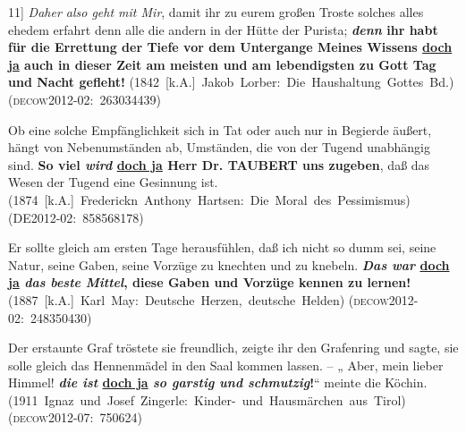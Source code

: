 \begin{exe}
	\ex\label{518} 

	11] \emph{Daher also geht mit Mir}, damit ihr zu eurem großen Troste solches alles ehedem erfahrt denn alle die andern in der Hütte der 			Purista; \textbf{\textit{denn} ihr habt für die Errettung der Tiefe vor dem Untergange Meines Wissens \underline{doch ja} auch in dieser Zeit am 			meisten und am lebendigsten zu Gott Tag und Nacht gefleht!}	
	\newline\hbox{}\hfill\hbox{(1842 [k.A.] Jakob Lorber: Die Haushaltung Gottes Bd.)}
	\newline
	\hbox{}\hfill\hbox{\scshape(decow2012-02: 263034439)}
\end{exe}								                        
											  
\begin{exe}
	\ex\label{519} 

	Ob eine solche Empfänglichkeit sich in Tat oder auch nur in Begierde äußert, hängt von Nebenumständen ab, Umständen, die von der Tugend unabhängig 			sind. \textbf{So viel \textit{wird} \underline{doch ja} Herr Dr. TAUBERT uns zugeben}, daß das Wesen der Tugend eine Gesinnung ist.	
	\newline
	\hbox{}\hfill\hbox{(1874 [k.A.] Frederickn Anthony Hartsen: Die Moral des Pessimismus)}
	\newline
	\hbox{}\hfill\hbox{\scshape(DE2012-02: 858568178)}
\end{exe}						                        
		      
\begin{exe}
	\ex\label{520} 

	Er sollte gleich am ersten Tage herausfühlen, daß ich nicht so dumm sei, seine Natur, seine Gaben, seine Vorzüge zu knechten und zu knebeln. 				\textbf{\textit{Das war} \underline{doch ja} \textit{das beste Mittel}, diese Gaben und Vorzüge kennen zu lernen!}			
	\hfill\hbox{(1887 [k.A.] Karl May: Deutsche Herzen, deutsche Helden)}
	\newline
	\hbox{}\hfill\hbox{\scshape(decow2012-02: 248350430)}
\end{exe}									 

\begin{exe}
	\ex\label{521} 

	Der erstaunte Graf tröstete sie freundlich, zeigte ihr den Grafenring und sagte, sie solle gleich das Hennenmädel in den Saal kommen lassen. – „		Aber, mein lieber Himmel! \textbf{\textit{die ist} \underline{doch ja} \textit{so garstig und schmutzig}!}“ meinte die Köchin.
	\newline
	\hbox{}\hfill\hbox{(1911 Ignaz und Josef Zingerle: Kinder- und Hausmärchen aus Tirol)}
	\newline
	\hbox{}\hfill\hbox{\scshape(decow2012-07: 750624)}
\end{exe}				             								            
  
